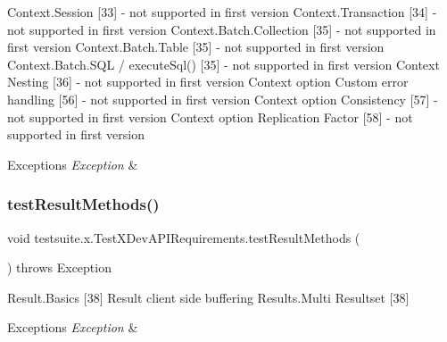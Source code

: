 Context.\+Session \mbox{[}33\mbox{]} -\/ not supported in first version Context.\+Transaction \mbox{[}34\mbox{]} -\/ not supported in first version Context.\+Batch.\+Collection \mbox{[}35\mbox{]} -\/ not supported in first version Context.\+Batch.\+Table \mbox{[}35\mbox{]} -\/ not supported in first version Context.\+Batch.\+S\+QL / execute\+Sql() \mbox{[}35\mbox{]} -\/ not supported in first version Context Nesting \mbox{[}36\mbox{]} -\/ not supported in first version Context option Custom error handling \mbox{[}56\mbox{]} -\/ not supported in first version Context option Consistency \mbox{[}57\mbox{]} -\/ not supported in first version Context option Replication Factor \mbox{[}58\mbox{]} -\/ not supported in first version


\begin{DoxyExceptions}{Exceptions}
{\em Exception} & \\
\hline
\end{DoxyExceptions}
\mbox{\label{classtestsuite_1_1x_1_1_test_x_dev_a_p_i_requirements_a3e75c9a73d04ce7ef9092afcb2a43947}} 
\subsubsection{\texorpdfstring{test\+Result\+Methods()}{testResultMethods()}}
{\footnotesize\ttfamily void testsuite.\+x.\+Test\+X\+Dev\+A\+P\+I\+Requirements.\+test\+Result\+Methods (\begin{DoxyParamCaption}{ }\end{DoxyParamCaption}) throws Exception}

Result.\+Basics \mbox{[}38\mbox{]} Result client side buffering Results.\+Multi Resultset \mbox{[}38\mbox{]}


\begin{DoxyExceptions}{Exceptions}
{\em Exception} & \\
\hline
\end{DoxyExceptions}
\mbox{\label{classtestsuite_1_1x_1_1_test_x_dev_a_p_i_requirements_ab061abe9969e81b420f800db4d744ded}} 
